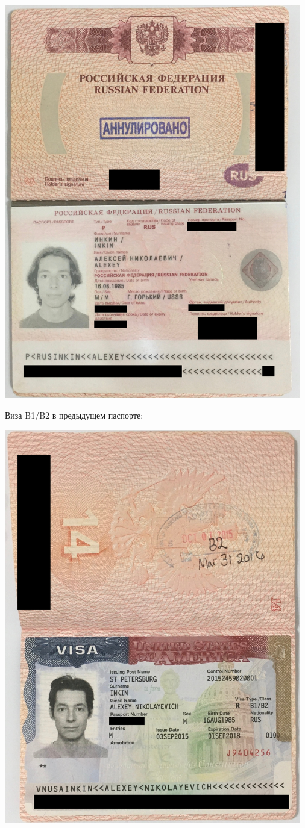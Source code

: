 \includegraphics[width=35em]{02-03_public}
\pagebreak

Виза B1/B2 в предыдущем паспорте:

\includegraphics[width=35em]{14-15_public}
\pagebreak

